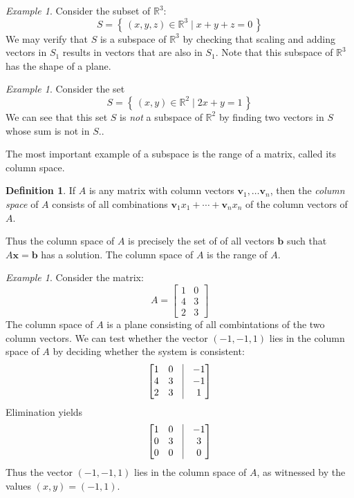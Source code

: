 \documentclass[11pt,oneside]{amsbook}
\newcommand{\set}[1]{\left\{\,#1\,\right\}}
\newcommand{\R}{\mathbb R}
\theoremstyle{definition}
\theoremstyle{plain}
\theoremstyle{definition}
\newtheorem{definition}[theorem]{Definition}
\theoremstyle{remark}
\newtheorem{example}[theorem]{Example}
\numberwithin{equation}{section}
\numberwithin{figure}{section}
\begin{document}
\begin{example}
  Consider the subset of $\R^3$:
  \[S=\set{(x,y,z)\in\R^3\mid x+y+z=0}
  \]
  We may verify that $S$ is a subspace of $\R^3$ by checking that scaling and adding vectors in $S_1$ results in vectors that are also in $S_1$. Note that this subspace of $\R^3$ has the shape of a plane.
\end{example}

\begin{example}
  Consider the set
  \[S=\set{(x,y)\in\R^2\mid 2x+y=1}
  \]
  We can see that this set $S$ is \emph{not} a subspace of $\R^2$ by finding two vectors in $S$ whose sum is not in $S$..
\end{example}

The most important example of a subspace is the range of a matrix, called its column space.

\begin{definition}
  If $A$ is any matrix with column vectors $\mathbf{v}_1,\ldots\mathbf{v}_n$, then the \emph{column space} of $A$ consists of all combinations $\mathbf{v}_1x_1+\cdots+\mathbf{v}_nx_n$ of the column vectors of $A$.
\end{definition}

Thus the column space of $A$ is precisely the set of of all vectors $\mathbf{b}$ such that $A\mathbf{x}=\mathbf{b}$ has a solution. The column space of $A$ is the range of $A$.

\begin{example}
  Consider the matrix:
  \[A=\begin{bmatrix}1&0\\4&3\\2&3\end{bmatrix}
  \]
  The column space of $A$ is a plane consisting of all combintations of the two column vectors. We can test whether the vector $(-1,-1,1)$ lies in the column space of $A$ by deciding whether the system is consistent:
  \[\begin{bmatrix}1&0&\vline&-1\\4&3&\vline&-1\\2&3&\vline&1\end{bmatrix}
  \]
  Elimination yields
  \[\begin{bmatrix}1&0&\vline&-1\\0&3&\vline&3\\0&0&\vline&0\end{bmatrix}
  \]  
  Thus the vector $(-1,-1,1)$ lies in the column space of $A$, as witnessed by the values $(x,y)=(-1,1)$.
\end{example}
\end{document}
